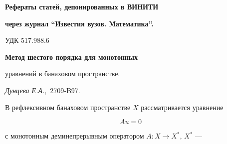 

















\setcounter{page}{89}


\pagestyle{plain}










\par


{\centerline{\bf Рефераты статей, депонированных в ВИНИТИ}}





{\centerline{\bf через журнал ``Известия вузов. Математика''.}}


\bigskip


\bigskip


{\hfill {УДК 517.988.6}}





{\bf Метод шестого порядка для монотонных


уравнений в банаховом пространстве.} {\it Дунцева Е.А.}, \No\,2709-B97.


\bigskip





В рефлексивном банаховом пространстве $X$ рассматривается уравнение


\begin{equation}


Au=0


\end{equation}


с монотонным деминепрерывным оператором $A:X\to X^*$, $X^*$ ---


